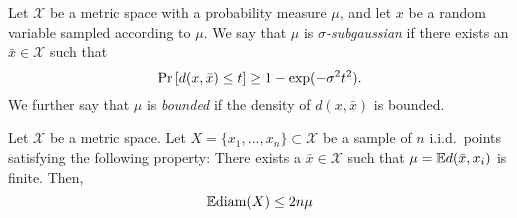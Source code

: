 \documentclass[../main.tex]{subfiles}
\newcommand{\set}[1]{\mathcal {#1}}
\newcommand{\dist}[2]{\distf({#1},{#2})}
\newcommand{\distf}{d}
\newcommand{\diam}[1]{\text{diam}({#1})}
\begin{document}
\begin{definition}
    Let $\set X$ be a metric space with a probability measure $\mu$, and
    let $x$ be a random variable sampled according to $\mu$.
    We say that $\mu$ is \emph{$\sigma$-subgaussian} if there exists an $\bar x\in\set X$ such that
    \begin{equation}
        \prob{\dist{x}{\bar x}\le t} \ge 1-\exp(-\sigma^2t^2)
        .
    \end{equation}
    We further say that $\mu$ is \emph{bounded} if 
    the density of $\dist{x}{\bar x}$ is bounded.
\end{definition}

%


\begin{lemma}
    Let $\set X$ be a metric space.
    Let $X=\{x_1,...,x_n\}\subset\set X$ be a sample of $n$ i.i.d.\ points satisfying the following property:
    There exists a $\bar x\in\set X$ such that $\mu=\E\dist{\bar x}{x_i}$ is finite.
    Then, 
    \begin{equation}
        \E\diam{X} \le 2n\mu
    \end{equation}
\end{lemma}
\end{document}
